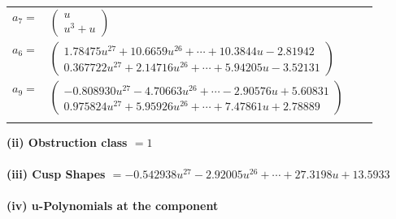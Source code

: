 \documentclass[1p]{elsarticle_modified}
\theoremstyle{definition}
\begin{document}
\begin{tabular}{m{7pt} m{180pt} m{7pt} m{180pt} }
\flushright $a_{7}=$&$\begin{pmatrix}u\\u^3+u\end{pmatrix}$ \\
\flushright $a_{6}=$&$\begin{pmatrix}1.78475 u^{27}+10.6659 u^{26}+\cdots+10.3844 u-2.81942\\0.367722 u^{27}+2.14716 u^{26}+\cdots+5.94205 u-3.52131\end{pmatrix}$ \\
\flushright $a_{9}=$&$\begin{pmatrix}-0.808930 u^{27}-4.70663 u^{26}+\cdots-2.90576 u+5.60831\\0.975824 u^{27}+5.95926 u^{26}+\cdots+7.47861 u+2.78889\end{pmatrix}$\\&\end{tabular}
\flushleft \textbf{(ii) Obstruction class $= 1$}\\~\\
\flushleft \textbf{(iii) Cusp Shapes $= -0.542938 u^{27}-2.92005 u^{26}+\cdots+27.3198 u+13.5933$}\\~\\
\newpage\renewcommand{\arraystretch}{1}
\flushleft \textbf{(iv) u-Polynomials at the component}\newline \\
\end{document}
